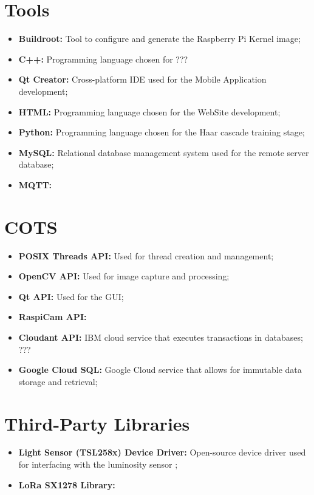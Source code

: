 \section{Tools}

\begin{itemize}
	\item \textbf{Buildroot:} Tool to configure and generate the Raspberry Pi Kernel image;
	\item \textbf{C++:} Programming language chosen for ???
	\item \textbf{Qt Creator:} Cross-platform IDE used for the Mobile Application development;
	\item \textbf{HTML:} Programming language chosen for the WebSite development;
	\item \textbf{Python:} Programming language chosen for the Haar cascade training stage;
	\item \textbf{MySQL:} Relational database management system used for the remote server database;
	\item \textbf{MQTT:}
\end{itemize}

\section{COTS}

\begin{itemize}
	\item \textbf{POSIX Threads API:} Used for thread creation and management;
	\item \textbf{OpenCV API:} Used for image capture and processing;
	\item \textbf{Qt API:} Used for the GUI;
	\item \textbf{RaspiCam API:} 
	\item \textbf{Cloudant API:} IBM cloud service that executes transactions in databases; ???
	\item \textbf{Google Cloud SQL:} Google Cloud service that allows for immutable data storage and retrieval;
\end{itemize}

\section{Third-Party Libraries}

\begin{itemize}
	\item \textbf{Light Sensor (TSL258x) Device Driver:} Open-source device driver used for interfacing with the luminosity sensor \cite{code_tsl};
	\item \textbf{LoRa SX1278 Library:}
\end{itemize}
